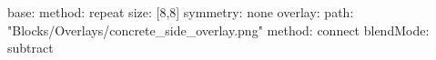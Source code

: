 base:
  method: repeat
  size: [8,8]
  symmetry: none
overlay:
  path: "Blocks/Overlays/concrete_side_overlay.png"
  method: connect
blendMode: subtract